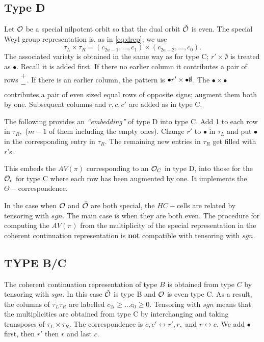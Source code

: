 \documentclass[11pt ,reqno]{amsart}
\begin{document}
\subsection{Type D}\label{3.3}  
Let $\mathcal O$ be a special nilpotent orbit so that the dual orbit ${\check {\mathcal O}}$ is
even. The special Weyl group representation is, as in \ref{eq:drep};
we use
\begin{equation*}
\tau_L\times\tau_R=(c_{2a-1},\dots ,c_1)\times (c_{2a-2},\dots
,c_0).  
\end{equation*}
The associated variety is obtained in the same way as for type C;
$r'\times \emptyset$ is treated as $\bullet$. Recall it is added first.
If there no earlier column it contributes a pair of rows
$\begin{matrix}+\\-\end{matrix}$. If there is an earlier column,  the pattern is
$\begin{matrix}\bullet r'\end{matrix}\times \begin{matrix}\bullet\emptyset\end{matrix}$. The
$\bullet\times\bullet$ contributes a pair of even sized equal rows of opposite
signs; augment them both by  one. Subsequent columns and $r,c,c'$ are added as in
type C.

\begin{remark*}
The following provides an \textit{``embedding''} of type D into type
C.  Add 1 to each row in $\tau_R,$ ($m-1$ of them including the empty
ones). Change $r'$ to $\bullet$ in $\tau_L$  and put $\bullet$ in the corresponding entry in
$\tau_R.$ The remaining new entries in $\tau_R$ get filled with $r$'s.

This embeds  the $AV(\pi)$ corresponding to an $\mathcal O_C$
in type D, into those for the $\mathcal O_c$ for type C where each row has been
augmented by one. It implements the $\Theta-$correspondence. 
\end{remark*}
\begin{remark*}
In the case when $\mathcal O$ and ${\check {\mathcal O}}$ are both special, the $HC-$cells are
related by tensoring with $sgn.$ The main case is when they are both
even. The procedure for computing the
$AV(\pi)$ from the multiplicity of the special representation in the
coherent continuation representation is \textbf{not} compatible with
tensoring with $sgn$.  
\end{remark*}

\newpage
\subsection{TYPE B/C} The coherent continuation representation of type
$B$ is obtained from type $C$ by tensoring with $sgn.$ In this case
${\check {\mathcal O}}$ is type B and $\mathcal O$ is even type C. As a result, the columns of
$\tau_L\tau_R$ are labelled $c_{2i}\ge \dots c_0\ge 0.$ 
Tensoring with $sgn$ means that the multiplicities are obtained from
type C by interchanging and taking transposes of $\tau_L\times\tau_R.$
The correspondence is $c,c'\longleftrightarrow r',r,$ and
$r\longleftrightarrow c.$  We add $\bullet$ first, then $r'$ then $r$
and last $c$. 
\end{document}
